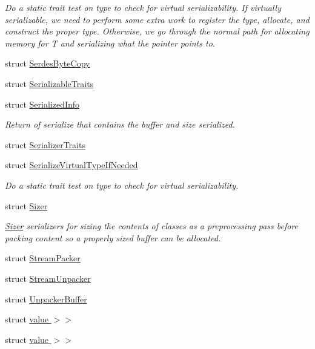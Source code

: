 \begin{DoxyCompactItemize}
\begin{DoxyCompactList}\small\item\em Do a static trait test on type to check for virtual serializability. If virtually serializable, we need to perform some extra work to register the type, allocate, and construct the proper type. Otherwise, we go through the normal path for allocating memory for T and serializing what the pointer points to. \end{DoxyCompactList}\item 
struct \hyperlink{structcheckpoint_1_1_serdes_byte_copy}{Serdes\+Byte\+Copy}
\item 
struct \hyperlink{structcheckpoint_1_1_serializable_traits}{Serializable\+Traits}
\item 
struct \hyperlink{structcheckpoint_1_1_serialized_info}{Serialized\+Info}
\begin{DoxyCompactList}\small\item\em Return of serialize that contains the buffer and size serialized. \end{DoxyCompactList}\item 
struct \hyperlink{structcheckpoint_1_1_serializer_traits}{Serializer\+Traits}
\item 
struct \hyperlink{structcheckpoint_1_1_serialize_virtual_type_if_needed}{Serialize\+Virtual\+Type\+If\+Needed}
\begin{DoxyCompactList}\small\item\em Do a static trait test on type to check for virtual serializability. \end{DoxyCompactList}\item 
struct \hyperlink{structcheckpoint_1_1_sizer}{Sizer}
\begin{DoxyCompactList}\small\item\em \hyperlink{structcheckpoint_1_1_sizer}{Sizer} serializers for sizing the contents of classes as a preprocessing pass before packing content so a properly sized buffer can be allocated. \end{DoxyCompactList}\item 
struct \hyperlink{structcheckpoint_1_1_stream_packer}{Stream\+Packer}
\item 
struct \hyperlink{structcheckpoint_1_1_stream_unpacker}{Stream\+Unpacker}
\item 
struct \hyperlink{structcheckpoint_1_1_unpacker_buffer}{Unpacker\+Buffer}
\item 
struct \hyperlink{structcheckpoint_1_1_reconstruct_as_virtual_if_needed_3_01_t_00_01_serializer_t_00_01typename_01bd353309780a1641c6b4da6107e9b732}{value $>$$>$}
\item 
struct \hyperlink{structcheckpoint_1_1_reconstruct_as_virtual_if_needed_3_01_t_00_01_serializer_t_00_01typename_0185cb3961b0806c240679cf17dd651016}{value $>$$>$}
\end{DoxyCompactItemize}
